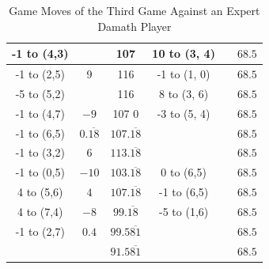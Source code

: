 \begin{appendices}
\begin{table}[H]
\begin{tabular}{cccccc}
          -1 to (4,3) &      &  107    &   10 to (3, 4) &      &  $68.5$    \\ \hline
          -1 to (2,5) &  9    &  116    &   -1 to (1, 0) &      &  $68.5$    \\ \hline
          -5 to (5,2) &      &  116    &   8 to (3, 6) &      &  $68.5$    \\ \hline
          -1 to (4,7) &  $-9$  & 107  0    &   -3 to (5, 4) &      &  $68.5$    \\ \hline
          -1 to (6,5) &  $0.\overline{18}$    & $107.\overline{18}$     &                &      &  $68.5$    \\ \hline
          -1 to (3,2) &  6    &  $113.\overline{18}$    &                &      &  $68.5$    \\ \hline
          -1 to (0,5) &  $-10$    &  $103.\overline{18}$    &   0 to (6,5)   &      &  $68.5$    \\ \hline
          4 to (5,6) &  $4$    &  $107.\overline{18}$    &   -1 to (6,5)   &      &  $68.5$    \\ \hline
          4 to (7,4) &  $-8$    &  $99.\overline{18}$   &   -5 to (1,6)   &      &  $68.5$    \\ \hline
          -1 to (2,7) &  $0.4$    & $99.5\overline{81}$     &                &      &  $68.5$    \\ \hline \hline
           &      & $91.5\overline{81}$     &                &      &  $68.5$    \\ \hline
    \end{tabular}
    \caption{Game Moves of the Third Game Against an Expert Damath Player}
    \label{tab:third-game}
\end{table}



\end{appendices}
